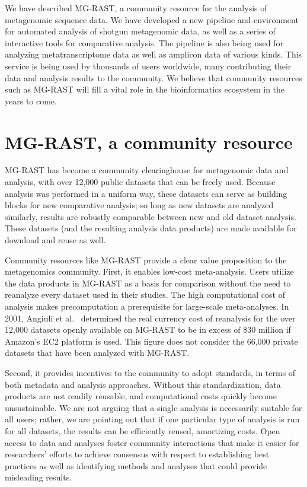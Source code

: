 \documentclass[12pt,fullpage]{report}
\begin{document}
We have described MG-RAST, a community resource for the analysis of metagenomic sequence data. We have developed a new pipeline and environment for automated analysis of shotgun metagenomic data, as well as a series of interactive tools for comparative analysis. The pipeline is also being used for analyzing metatranscriptome data as well as amplicon data of various kinds. This service is being used by thousands of users worldwide, many contributing their data and analysis results to the community. We believe that community resources such as MG-RAST will fill a vital role in the bioinformatics ecosystem in the years to come.
\section{MG-RAST, a community resource}
MG-RAST has become a community clearinghouse for metagenomic data and analysis, with over 12,000 public datasets that can be freely used. Because analysis was performed in a uniform way, these datasets can serve as building blocks for new comparative analysis; so long as new datasets are analyzed similarly, results are robustly comparable between new and old dataset analysis. These datasets (and the resulting analysis data products) are made available for download and reuse as well.

Community resources like MG-RAST provide a clear value proposition to the metagenomics community. First, it enables low-cost meta-analysis. Users utilize the data products in MG-RAST as a basis for comparison without the need to reanalyze every dataset used in their studies. The high computational cost of analysis \cite{MGCLOUD} makes precomputation a prerequisite for large-scale meta-analyses. In 2001, Angiuli et al.~\cite{CLOVR} determined the real currency cost of reanalysis for the over 12,000 datasets openly available on MG-RAST to be in excess of \$30 million if Amazon's EC2 platform is used.
This figure does not consider the 66,000 private datasets that have been analyzed with MG-RAST.

Second, it provides incentives to the community to adopt standards, in terms of both  metadata and analysis approaches. Without this standardization, data products are not readily reusable, and computational costs quickly become unsustainable. We are not arguing that a single analysis is necessarily suitable for all users; rather, we are pointing out that if one particular type of analysis is run for all datasets, the results can be efficiently reused, amortizing costs. Open access to data and analyses foster community interactions that make it easier for researchers' efforts to achieve consensus with respect to establishing best practices as well as identifying methods and analyses that could provide misleading results.
\end{document}

